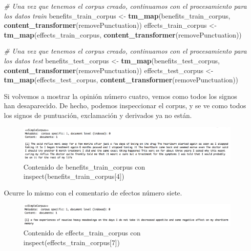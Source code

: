 \documentclass[spanish,]{article}
\newenvironment{Shaded}{\begin{snugshade}}{\end{snugshade}}
\newcommand{\KeywordTok}[1]{\textcolor[rgb]{0.13,0.29,0.53}{\textbf{#1}}}
\newcommand{\StringTok}[1]{\textcolor[rgb]{0.31,0.60,0.02}{#1}}
\newcommand{\CommentTok}[1]{\textcolor[rgb]{0.56,0.35,0.01}{\textit{#1}}}
\newcommand{\NormalTok}[1]{#1}
\begin{document}
\begin{Shaded}
\begin{Highlighting}[]
\CommentTok{# Una vez que tenemos el corpus creado, continuamos con el procesamiento para los datos train}
\NormalTok{benefits_train_corpus <-}\StringTok{ }\KeywordTok{tm_map}\NormalTok{(benefits_train_corpus, }\KeywordTok{content_transformer}\NormalTok{(removePunctuation))}
\NormalTok{effects_train_corpus <-}\StringTok{ }\KeywordTok{tm_map}\NormalTok{(effects_train_corpus, }\KeywordTok{content_transformer}\NormalTok{(removePunctuation))}

\CommentTok{# Una vez que tenemos el corpus creado, continuamos con el procesamiento para los datos test}
\NormalTok{benefits_test_corpus <-}\StringTok{ }\KeywordTok{tm_map}\NormalTok{(benefits_test_corpus, }\KeywordTok{content_transformer}\NormalTok{(removePunctuation))}
\NormalTok{effects_test_corpus <-}\StringTok{ }\KeywordTok{tm_map}\NormalTok{(effects_test_corpus, }\KeywordTok{content_transformer}\NormalTok{(removePunctuation))}
\end{Highlighting}
\end{Shaded}

Si volvemos a mostrar la opinión número cuatro, vemos como todos los
signos han desaparecido. De hecho, podemos inspeccionar el corpus, y se
ve como todos los signos de puntuación, exclamación y derivados ya no
están.

\begin{figure}[h]
    \centering
    \includegraphics[width=1\textwidth]{imagenes/benefits_signos_puntuacion.png}
    \caption{Contenido de benefits\_train\_corpus con inspect(benefits\_train\_corpus[4])}
    \label{benefits2}
\end{figure}

Ocurre lo mismo con el comentario de efectos número siete.

\begin{figure}[h]
    \centering
    \includegraphics[width=1\textwidth]{imagenes/effects_signos_puntuacion.png}
    \caption{Contenido de effects\_train\_corpus con inspect(effects\_train\_corpus[7])}
    \label{benefits2}
\end{figure}
\end{document}
